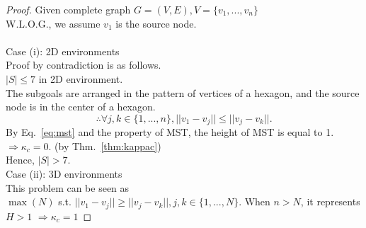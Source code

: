\begin{proof}
Given complete graph $G=(V, E), V=\{ v_1,...,v_n \}$ \\
W.L.O.G., we assume $v_1$ is the source node.\\
\\
Case (i): 2D environments\\
Proof by contradiction is as follows. \\
$|S| \le 7$ in 2D environment. \\
The subgoals are arranged in the pattern of vertices of a hexagon, and the source node is in the center of a hexagon. \\
\begin{equation}\label{eq:mst}
  \therefore\forall j,k \in \{1,...,n\}, ||v_1-v_j||\le||v_j-v_k||.
\end{equation}
By Eq.~\ref{eq:mst} and the property of MST, the height of MST is equal to 1. \\
$\Rightarrow \kappa_c = 0.$ (by Thm.~\ref{thm:kappac})\\
Hence, $|S| > 7.$\\
%
%
Case (ii): 3D environments\\
This problem can be seen as  \\
$\max (N)$ s.t. $ ||v_1-v_j||\ge||v_j-v_k||, j,k\in\{ 1,...,N \} $.
When $n > N$, it represents $H > 1$ $\Rightarrow \kappa_c = 1$



\end{proof}
